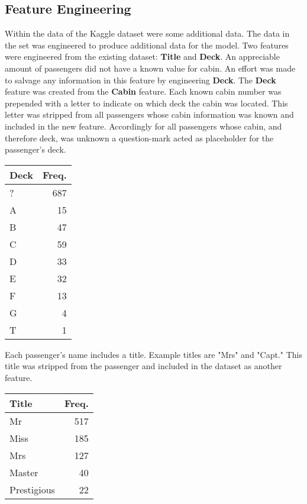 \documentclass[10pt]{article}
\begin{document}
\begin{multicols}{2}
\subsection{Feature Engineering}
	Within the data of the Kaggle dataset were some additional data.
	The data in the set was engineered to produce additional data for the model.
	Two features were engineered from the existing dataset: \textbf{Title} and \textbf{Deck}.
	An appreciable amount of passengers did not have a known value for cabin.
	An effort was made to salvage any information in this feature by engineering \textbf{Deck}.
	The \textbf{Deck} feature was created from the \textbf{Cabin} feature.
	Each known cabin number was prepended with a letter to indicate on which deck the cabin was located.
	This letter was stripped from all passengers whose cabin information was known and included in the new feature.
	Accordingly for all passengers whose cabin, and therefore deck, was unknown a question-mark acted as placeholder for the passenger's deck.
	\begin{center}
	\begin{tabular}{l r}
		\textbf{Deck}	& Freq.\\
		\hline
		? 	& 687\\
		A 	& 15\\
		B 	& 47\\
		C 	& 59\\
		D 	& 33\\
		E 	& 32\\
		F 	& 13\\
		G 	& 4\\
		T 	& 1\\
	\end{tabular}
	\end{center}

	Each passenger's name includes a title.
	Example titles are "Mrs" and "Capt."
	This title was stripped from the passenger and included in the dataset as another feature.\\
	\begin{center}
	\begin{tabular}{l r}
		\textbf{Title}&	Freq.\\
		\hline
		Mr            & 517\\
		Miss          & 185\\
		Mrs           & 127\\
		Master         & 40\\
		Prestigious    & 22\\
	\end{tabular}
	\end{center}


\end{multicols}
\end{document}

